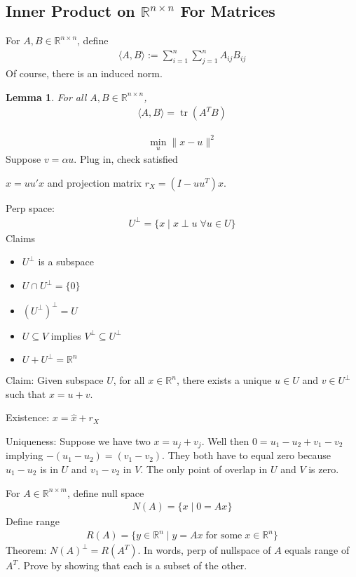 \documentclass[12pt]{book}
\numberwithin{equation}{section} %
\theoremstyle{plain}
\newtheorem{lem}[thm]{Lemma}
\theoremstyle{definition}
\theoremstyle{remark}
\newcommand{\trace}{\operatorname{tr}}
\newcommand{\R}{\mathbb{R}}
\begin{document}
\clearpage
\subsection{Inner Product on $\R^{n\times n}$ For Matrices}

For $A,B\in\R^{n\times n}$, define
\begin{align*}
  \langle A,B\rangle
  := \sum_{i=1}^n\sum_{j=1}^n A_{ij}B_{ij}
\end{align*}
Of course, there is an induced norm.

\begin{lem}
For all $A,B\in\R^{n\times n}$,
\begin{align*}
  \langle A,B\rangle
  =
  \trace(A^TB)
\end{align*}
\end{lem}

\begin{align*}
  \min_u \lVert x-u\rVert^2
\end{align*}
Suppose $v=\alpha u$.
Plug in, check satisfied

$\hat{x}=uu'x$
and projection matrix
$r_X=(I-uu^T)x$.


Perp space:
\begin{align*}
  U^\perp
  =
  \{x \;|\; x\perp u\;\forall u\in U\}
\end{align*}
Claims
\begin{itemize}
  \item $U^\perp$ is a subspace
  \item $U\cap U^\perp=\{0\}$
  \item $(U^\perp)^\perp=U$
  \item $U\subseteq V$ implies $V^\perp \subseteq U^\perp$
  \item $U+U^\perp = \R^n$
\end{itemize}
Claim: Given subspace $U$, for all $x\in \R^n$, there exists a unique
$u\in U$ and $v\in U^\perp$ such that $x=u+v$.

Existence: $x=\hat{x}+r_X$

Uniqueness: Suppose we have two $x=u_j + v_j$.
Well then $0=u_1-u_2+v_1-v_2$ implying $-(u_1-u_2)=(v_1-v_2)$.
They both have to equal zero because $u_1-u_2$ is in $U$ and $v_1-v_2$
in $V$. The only point of overlap in $U$ and $V$ is zero.


For $A\in \R^{n\times m}$, define null space
\begin{align*}
  N(A) = \{x\;|\; 0=Ax\}
\end{align*}
Define range
\begin{align*}
  R(A) = \{y\in \R^n\;|\; y=Ax \;\text{for some}\; x\in\R^n\}
\end{align*}
Theorem: $N(A)^{\perp}=R(A^T)$.
In words, perp of nullspace of $A$ equals range of $A^T$.
Prove by showing that each is a subset of the other.
\end{document}
